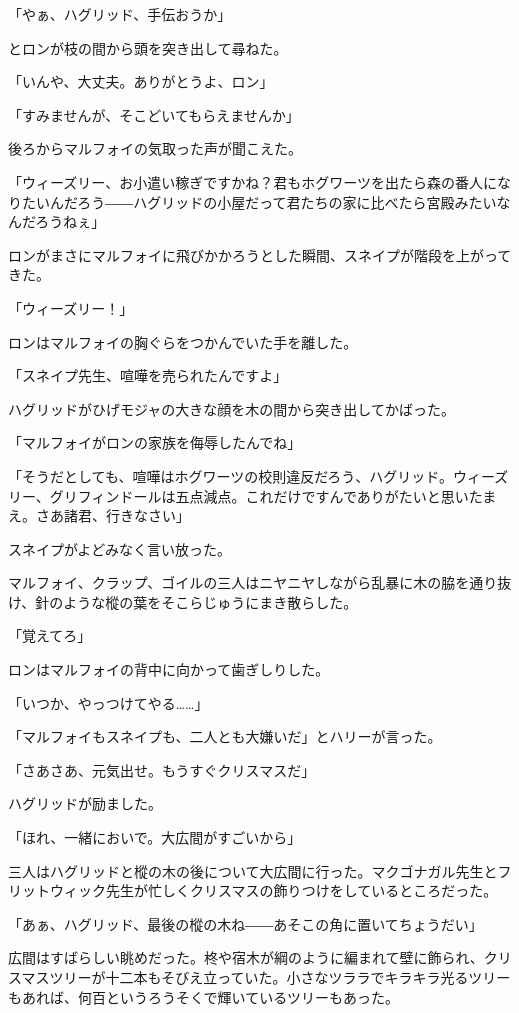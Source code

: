 \documentclass[10pt,a4paper]{article}
\begin{document}
\begin{CJK}{UTF8}{min}
「やぁ、ハグリッド、手伝おうか」

とロンが枝の間から頭を突き出して尋ねた。

「いんや、大丈夫。ありがとうよ、ロン」

「すみませんが、そこどいてもらえませんか」

後ろからマルフォイの気取った声が聞こえた。

「ウィーズリー、お小遣い稼ぎですかね？君もホグワーツを出たら森の番人になりたいんだろう――ハグリッドの小屋だって君たちの家に比べたら宮殿みたいなんだろうねぇ」

ロンがまさにマルフォイに飛びかかろうとした瞬間、スネイプが階段を上がってきた。

「ウィーズリー！」

ロンはマルフォイの胸ぐらをつかんでいた手を離した。

「スネイプ先生、喧嘩を売られたんですよ」

ハグリッドがひげモジャの大きな顔を木の間から突き出してかばった。

「マルフォイがロンの家族を侮辱したんでね」

「そうだとしても、喧嘩はホグワーツの校則違反だろう、ハグリッド。ウィーズリー、グリフィンドールは五点減点。これだけですんでありがたいと思いたまえ。さあ諸君、行きなさい」

スネイプがよどみなく言い放った。

マルフォイ、クラップ、ゴイルの三人はニヤニヤしながら乱暴に木の脇を通り抜け、針のような樅の葉をそこらじゅうにまき散らした。

「覚えてろ」

ロンはマルフォイの背中に向かって歯ぎしりした。

「いつか、やっつけてやる……」

「マルフォイもスネイプも、二人とも大嫌いだ」とハリーが言った。

「さあさあ、元気出せ。もうすぐクリスマスだ」

ハグリッドが励ました。

「ほれ、一緒においで。大広間がすごいから」

三人はハグリッドと樅の木の後について大広間に行った。マクゴナガル先生とフリットウィック先生が忙しくクリスマスの飾りつけをしているところだった。

「あぁ、ハグリッド、最後の樅の木ね――あそこの角に置いてちょうだい」

広間はすばらしい眺めだった。柊や宿木が綱のように編まれて壁に飾られ、クリスマスツリーが十二本もそびえ立っていた。小さなツララでキラキラ光るツリーもあれば、何百というろうそくで輝いているツリーもあった。


\end{CJK}
\end{document}
